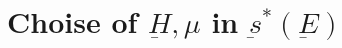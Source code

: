 \documentclass[11pt]{article}
\theoremstyle{boldStyle}
\begin{document}
\section{Choise of $\underbar{H}, \mu$ in $\underbar{s}^*(\underbar{E})$}






\end{document}
